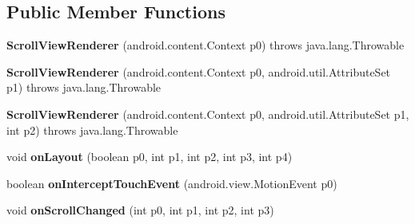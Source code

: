 \subsection*{Public Member Functions}
\begin{DoxyCompactItemize}
\item 
\hypertarget{classmd5282f1122c1313907b9bf274dd2c2f344_1_1ScrollViewRenderer_ad254ec275f2f58cc98c5c9479115c133}{}{\bfseries Scroll\+View\+Renderer} (android.\+content.\+Context p0)  throws java.\+lang.\+Throwable 	\label{classmd5282f1122c1313907b9bf274dd2c2f344_1_1ScrollViewRenderer_ad254ec275f2f58cc98c5c9479115c133}

\item 
\hypertarget{classmd5282f1122c1313907b9bf274dd2c2f344_1_1ScrollViewRenderer_a05a603713e0f44385eac181005be18f1}{}{\bfseries Scroll\+View\+Renderer} (android.\+content.\+Context p0, android.\+util.\+Attribute\+Set p1)  throws java.\+lang.\+Throwable 	\label{classmd5282f1122c1313907b9bf274dd2c2f344_1_1ScrollViewRenderer_a05a603713e0f44385eac181005be18f1}

\item 
\hypertarget{classmd5282f1122c1313907b9bf274dd2c2f344_1_1ScrollViewRenderer_a1ab8d7b81cb9fb3561ca79ac04da8aeb}{}{\bfseries Scroll\+View\+Renderer} (android.\+content.\+Context p0, android.\+util.\+Attribute\+Set p1, int p2)  throws java.\+lang.\+Throwable 	\label{classmd5282f1122c1313907b9bf274dd2c2f344_1_1ScrollViewRenderer_a1ab8d7b81cb9fb3561ca79ac04da8aeb}

\item 
\hypertarget{classmd5282f1122c1313907b9bf274dd2c2f344_1_1ScrollViewRenderer_ad91d189fc3ba405d058c083ab0f8921b}{}void {\bfseries on\+Layout} (boolean p0, int p1, int p2, int p3, int p4)\label{classmd5282f1122c1313907b9bf274dd2c2f344_1_1ScrollViewRenderer_ad91d189fc3ba405d058c083ab0f8921b}

\item 
\hypertarget{classmd5282f1122c1313907b9bf274dd2c2f344_1_1ScrollViewRenderer_ae2c425bd68c99dc111c2413acdf5a2c4}{}boolean {\bfseries on\+Intercept\+Touch\+Event} (android.\+view.\+Motion\+Event p0)\label{classmd5282f1122c1313907b9bf274dd2c2f344_1_1ScrollViewRenderer_ae2c425bd68c99dc111c2413acdf5a2c4}

\item 
\hypertarget{classmd5282f1122c1313907b9bf274dd2c2f344_1_1ScrollViewRenderer_ad8802796366695c62999094474403435}{}void {\bfseries on\+Scroll\+Changed} (int p0, int p1, int p2, int p3)\label{classmd5282f1122c1313907b9bf274dd2c2f344_1_1ScrollViewRenderer_ad8802796366695c62999094474403435}


\end{DoxyCompactItemize}

